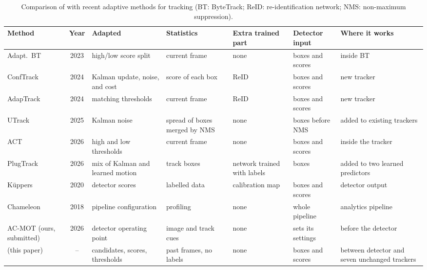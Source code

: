 \begin{table}[!tp]
\caption{Comparison of \scl{} with recent adaptive methods for tracking (BT: ByteTrack; ReID: re-identification network; NMS: non-maximum suppression).}
\label{tab:related}
\centering\footnotesize
\setlength{\tabcolsep}{3pt}
\begin{tabular}{@{}>{\raggedright\arraybackslash}p{18mm}c>{\raggedright\arraybackslash}p{21mm}>{\raggedright\arraybackslash}p{19mm}>{\raggedright\arraybackslash}p{15mm}>{\raggedright\arraybackslash}p{16mm}>{\raggedright\arraybackslash}p{21mm}@{}}
\toprule
Method & Year & Adapted & Statistics & Extra trained part & Detector input & Where it works\\
\midrule
Adapt.\ BT \cite{ma2023adaptivebytetrack} & 2023 & high/low score split & current frame & none & boxes and scores & inside BT\\
ConfTrack \cite{jung2024conftrack} & 2024 & Kalman update, noise, and cost & score of each box & ReID & boxes and scores & new tracker\\
AdapTrack \cite{shim2024adaptrack} & 2024 & matching thresholds & current frame & ReID & boxes and scores & new tracker\\
UTrack \cite{solano2025utrack} & 2025 & Kalman noise & spread of boxes merged by NMS & none & boxes before NMS & added to existing trackers\\
ACT \cite{act2026adaptive} & 2026 & high and low thresholds & current frame & none & boxes and scores & inside the tracker\\
PlugTrack \cite{kim2026plugtrack} & 2026 & mix of Kalman and learned motion & track boxes & network trained with labels & boxes & added to two learned predictors\\
K{\"u}ppers \cite{kuppers2020detcalib} & 2020 & detector scores & labelled data & calibration map & boxes and scores & detector output\\
Chameleon \cite{jiang2018chameleon} & 2018 & pipeline configuration & profiling & none & whole pipeline & analytics pipeline\\
AC-MOT (ours, submitted) & 2026 & detector operating point & image and track cues & none & sets its settings & before the detector\\
\scl{} (this paper) & -- & candidates, scores, thresholds & past frames, no labels & none & boxes and scores & between detector and seven unchanged trackers\\
\bottomrule
\end{tabular}
\end{table}
